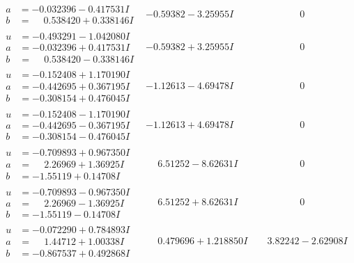 \documentclass[1p]{elsarticle_modified}
\theoremstyle{definition}
\begin{document}
$$\begin{array}{c|c|c}
\begin{aligned}
a &= -0.032396 - 0.417531 I \\
b &= \phantom{-}0.538420 + 0.338146 I\end{aligned}
 & -0.59382 - 3.25955 I & \phantom{-0.000000 } 0 \\ \hline\begin{aligned}
u &= -0.493291 - 1.042080 I \\
a &= -0.032396 + 0.417531 I \\
b &= \phantom{-}0.538420 - 0.338146 I\end{aligned}
 & -0.59382 + 3.25955 I & \phantom{-0.000000 } 0 \\ \hline\begin{aligned}
u &= -0.152408 + 1.170190 I \\
a &= -0.442695 + 0.367195 I \\
b &= -0.308154 + 0.476045 I\end{aligned}
 & -1.12613 - 4.69478 I & \phantom{-0.000000 } 0 \\ \hline\begin{aligned}
u &= -0.152408 - 1.170190 I \\
a &= -0.442695 - 0.367195 I \\
b &= -0.308154 - 0.476045 I\end{aligned}
 & -1.12613 + 4.69478 I & \phantom{-0.000000 } 0 \\ \hline\begin{aligned}
u &= -0.709893 + 0.967350 I \\
a &= \phantom{-}2.26969 + 1.36925 I \\
b &= -1.55119 + 0.14708 I\end{aligned}
 & \phantom{-}6.51252 - 8.62631 I & \phantom{-0.000000 } 0 \\ \hline\begin{aligned}
u &= -0.709893 - 0.967350 I \\
a &= \phantom{-}2.26969 - 1.36925 I \\
b &= -1.55119 - 0.14708 I\end{aligned}
 & \phantom{-}6.51252 + 8.62631 I & \phantom{-0.000000 } 0 \\ \hline\begin{aligned}
u &= -0.072290 + 0.784893 I \\
a &= \phantom{-}1.44712 + 1.00338 I \\
b &= -0.867537 + 0.492868 I\end{aligned}
 & \phantom{-}0.479696 + 1.218850 I & \phantom{-}3.82242 - 2.62908 I \\ \hline\begin{aligned}

\end{aligned}
\end{array}$$
\end{document}
